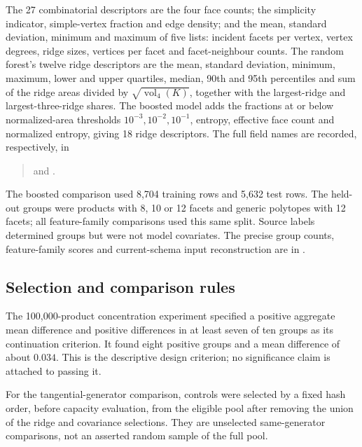 The 27 combinatorial descriptors are the four face counts; the simplicity
indicator, simple-vertex fraction and edge density; and the mean, standard
deviation, minimum and maximum of five lists: incident facets per vertex,
vertex degrees, ridge sizes, vertices per facet and facet-neighbour counts.
The random forest's twelve ridge descriptors are the mean, standard deviation,
minimum, maximum, lower and upper quartiles, median, 90th and 95th percentiles and sum of the
ridge areas divided by $\sqrt{\operatorname{vol}_4(K)}$, together with the
largest-ridge and largest-three-ridge shares. The boosted model adds the
fractions at or below normalized-area thresholds $10^{-3},10^{-2},10^{-1}$,
entropy, effective face count and normalized entropy, giving 18 ridge
descriptors. The full field names are recorded, respectively, in
\begin{quote}
\small\raggedright
{}
and .
\end{quote}

The boosted comparison used 8,704 training rows and 5,632 test rows. The
held-out groups were products with 8, 10 or 12 facets and generic polytopes
with 12 facets; all feature-family comparisons used this same split. Source
labels determined groups but were not model covariates. The precise group
counts, feature-family scores and current-schema input reconstruction are in
.


\subsection{Selection and comparison rules}\label{app:ds-selection}

The 100,000-product concentration experiment specified a positive aggregate
mean difference and positive differences in at least seven of ten groups
as its continuation criterion. It found eight positive groups and a mean
difference of about $0.034$. This is the descriptive design criterion;
no significance claim is attached to passing it.

For the tangential-generator comparison, controls were selected by a fixed
hash order, before capacity evaluation, from the eligible pool after removing
the union of the ridge and covariance selections. They are unselected
same-generator comparisons, not an asserted random sample of the full pool.

